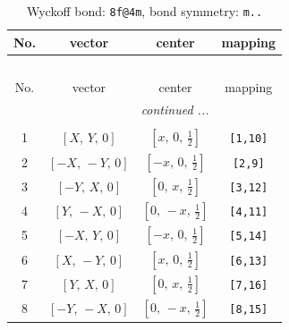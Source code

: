 \documentclass[fleqn,8pt]{jsarticle}
\begin{document}
\begin{longtable}{cccc}
\caption{Wyckoff bond: {\tt 8f@4m}, bond symmetry: {\tt m..}}
 \\
 \hline \hline
No. & vector & center & mapping \\ \hline \endfirsthead

\multicolumn{3}{l}{\tablename\ \thetable{}} \\
 \hline \hline
No. & vector & center & mapping \\ \hline \endhead

 \hline \hline
\multicolumn{3}{r}{\footnotesize\it continued ...} \\ \endfoot

 \hline \hline
\multicolumn{3}{r}{} \\ \endlastfoot

1 & $\left[ X,\, Y,\, 0 \right]$ & $\left[ x,\, 0,\, \frac{1}{2} \right]$ & {\tt [1,10]} \\ \hline
2 & $\left[ - X,\, - Y,\, 0 \right]$ & $\left[ - x,\, 0,\, \frac{1}{2} \right]$ & {\tt [2,9]} \\ \hline
3 & $\left[ - Y,\, X,\, 0 \right]$ & $\left[ 0,\, x,\, \frac{1}{2} \right]$ & {\tt [3,12]} \\ \hline
4 & $\left[ Y,\, - X,\, 0 \right]$ & $\left[ 0,\, - x,\, \frac{1}{2} \right]$ & {\tt [4,11]} \\ \hline
5 & $\left[ - X,\, Y,\, 0 \right]$ & $\left[ - x,\, 0,\, \frac{1}{2} \right]$ & {\tt [5,14]} \\ \hline
6 & $\left[ X,\, - Y,\, 0 \right]$ & $\left[ x,\, 0,\, \frac{1}{2} \right]$ & {\tt [6,13]} \\ \hline
7 & $\left[ Y,\, X,\, 0 \right]$ & $\left[ 0,\, x,\, \frac{1}{2} \right]$ & {\tt [7,16]} \\ \hline
8 & $\left[ - Y,\, - X,\, 0 \right]$ & $\left[ 0,\, - x,\, \frac{1}{2} \right]$ & {\tt [8,15]} \\
\end{longtable}
\renewcommand{\arraystretch}{1.2}
\end{document}
